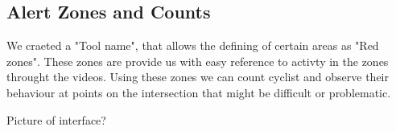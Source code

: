 \documentclass[
10pt, %
a4paper, %
oneside, %
headinclude,footinclude, %
] {book}%
\begin{document}
\subsection{Alert Zones and Counts}

We craeted a "Tool name", that allows the defining of certain areas as "Red zones". These zones are provide us with easy reference to activty in the zones throught the videos.
Using these zones we can count cyclist and observe their behaviour at points on the intersection that might be difficult or
problematic.

Picture of interface?





\end{document}
